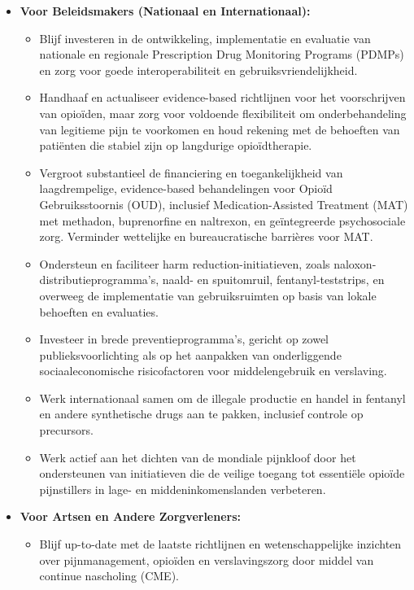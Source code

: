 \documentclass[11pt, a4paper]{report} %
\begin{document}
\begin{itemize}
    \item \textbf{Voor Beleidsmakers (Nationaal en Internationaal):}
        \begin{itemize}
            \item Blijf investeren in de ontwikkeling, implementatie en evaluatie van nationale en regionale Prescription Drug Monitoring Programs (PDMPs) en zorg voor goede interoperabiliteit en gebruiksvriendelijkheid.
            \item Handhaaf en actualiseer evidence-based richtlijnen voor het voorschrijven van opioïden, maar zorg voor voldoende flexibiliteit om onderbehandeling van legitieme pijn te voorkomen en houd rekening met de behoeften van patiënten die stabiel zijn op langdurige opioïdtherapie.
            \item Vergroot substantieel de financiering en toegankelijkheid van laagdrempelige, evidence-based behandelingen voor Opioïd Gebruiksstoornis (OUD), inclusief Medication-Assisted Treatment (MAT) met methadon, buprenorfine en naltrexon, en geïntegreerde psychosociale zorg. Verminder wettelijke en bureaucratische barrières voor MAT.
            \item Ondersteun en faciliteer harm reduction-initiatieven, zoals naloxon-distributieprogramma's, naald- en spuitomruil, fentanyl-teststrips, en overweeg de implementatie van gebruiksruimten op basis van lokale behoeften en evaluaties.
            \item Investeer in brede preventieprogramma's, gericht op zowel publieksvoorlichting als op het aanpakken van onderliggende sociaaleconomische risicofactoren voor middelengebruik en verslaving.
            \item Werk internationaal samen om de illegale productie en handel in fentanyl en andere synthetische drugs aan te pakken, inclusief controle op precursors.
            \item Werk actief aan het dichten van de mondiale pijnkloof door het ondersteunen van initiatieven die de veilige toegang tot essentiële opioïde pijnstillers in lage- en middeninkomenslanden verbeteren.
        \end{itemize}
    \item \textbf{Voor Artsen en Andere Zorgverleners:}
        \begin{itemize}
            \item Blijf up-to-date met de laatste richtlijnen en wetenschappelijke inzichten over pijnmanagement, opioïden en verslavingszorg door middel van continue nascholing (CME).

\end{itemize}
\end{itemize}
\end{document}
